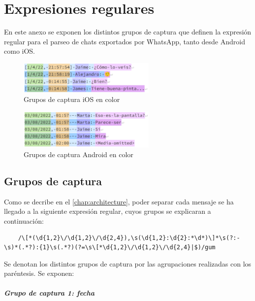 \chapter{Expresiones regulares} \label{chap:regex}

En este anexo se exponen los distintos grupos de captura que definen la expresión regular para el parseo de chats exportados por WhatsApp, tanto desde Android como iOS.

\begin{figure}[h]
	\centering
	\includegraphics[width=0.6\textwidth]{img/regex_ios.png}
	\caption{Grupos de captura iOS en color}
	\label{fig:chap:regex_ios}
\end{figure}

\begin{figure}[h]
	\centering
	\includegraphics[width=0.6\textwidth]{img/regex_android.png}
	\caption{Grupos de captura Android en color}
	\label{fig:chap:regex_android}
\end{figure}

\section{Grupos de captura}

Como se decribe en el \autoref{chap:architecture}, poder separar cada mensaje se ha llegado a la siguiente expresión regular, cuyos grupos se explicaran a continuación:

\begin{lstlisting}
	/\[*(\d{1,2}\/\d{1,2}\/\d{2,4}),\s(\d{1,2}:\d{2}:*\d*)\]*\s(?:-\s)*(.*?):{1}\s(.*?)(?=\s\[*\d{1,2}\/\d{1,2}\/\d{2,4}|$)/gum
\end{lstlisting}

Se denotan los distintos grupos de captura por las agrupaciones realizadas con los paréntesis. Se exponen:

\paragraph{Grupo de captura 1: fecha}\mbox{}\\

